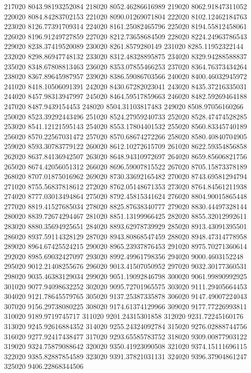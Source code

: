 {217020 8043.98193252084
218020 8052.46286616989
219020 8062.91847311052
220020 8084.84283702153
221020 8090.01269071804
222020 8102.12462184763
223020 8126.77391709314
224020 8161.25082465796
225020 8194.55812458061
226020 8196.91249727859
227020 8212.73658684509
228020 8224.24963786543
229020 8238.37419520089
230020 8261.8579280149
231020 8285.11952322144
232020 8298.86947748132
233020 8312.48328895875
234020 8329.94288588837
235020 8348.67808813463
236020 8353.07855466253
237020 8364.76373434264
238020 8367.89645987957
239020 8386.59086703566
240020 8400.46032945972
241020 8418.10506091391
242020 8430.67282023041
243020 8435.37216335031
244020 8457.98313947997
245020 8464.59517859663
246020 8482.59269464188
247020 8487.9439154453
248020 8504.31103817483
249020 8508.97056160266
250020 8523.39292443496
251020 8524.27959240733
252020 8528.47474528285
253020 8541.12121595143
254020 8553.17804401532
255020 8560.83345740189
256020 8570.22567031472
257020 8570.68674272266
258020 8580.40840704905
259020 8593.30783779122
260020 8612.10272615709
261020 8622.59354856858
262020 8637.84136942507
263020 8648.94310972697
264020 8659.85606821756
265020 8674.42056051312
266020 8696.59007815522
267020 8705.15873378189
268020 8707.01875016962
269020 8730.33692165482
270020 8743.69581294794
271020 8755.56837818612
272020 8762.05148671353
273020 8764.84561211938
274020 8777.03013494864
275020 8792.45815341624
276020 8804.90015865448
277020 8819.41527685034
278020 8825.87638340777
279020 8830.44497328144
280020 8839.72674294467
281020 8851.13199966425
282020 8855.32012992611
283020 8880.35694925651
284020 8893.62978739929
285020 8913.43091395501
286020 8937.59114328129
287020 8943.80868547459
288020 8948.47314778958
289020 8964.67425524215
290020 8965.23937876453
291020 8975.70271360614
292020 8985.69032427097
293020 8992.49961798356
294020 9000.4603152248
295020 9012.21408255676
296020 9013.41507050952
297020 9032.30177360531
298020 9035.46383129034
299020 9051.19092846798
300020 9061.99890992925
301020 9077.94098632252
302020 9095.72701965575
303020 9111.29405664453
304020 9121.78645579765
305020 9137.25387335878
306020 9147.49007224043
307020 9156.29738080225
308020 9174.61374129966
309020 9177.77226993811
310020 9189.9719745717
311020 9201.24315301858
312020 9231.72245160176
313020 9245.92616884352
314020 9255.24324092784
315020 9276.02888744756
316020 9277.92417438477
317020 9293.65585783752
318020 9309.00877903122
319020 9324.75879088642
320020 9350.41923090508
321020 9374.15111696115
322020 9385.82887854589
323020 9391.37821031131
324020 9396.37904861247
325020 9406.22868344506
}
